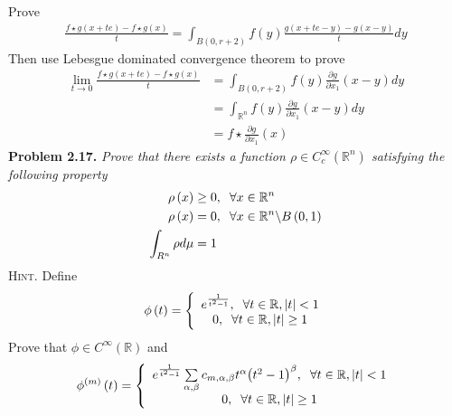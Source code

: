 \documentclass[a4paper]{article}
\numberwithin{equation}{section}
\begin{document}
Prove
\begin{align}
\frac{{f\star g\left( {x + te} \right) - f\star g\left( x \right)}}{t} = \int_{B\left( {0,r + 2} \right)} {f\left( y \right)\frac{{g\left( {x + te - y} \right) - g\left( {x - y} \right)}}{t}dy} 
\end{align}
Then use Lebesgue dominated convergence theorem to prove
\begin{align}
\mathop {\lim }\limits_{t \to 0} \frac{{f\star g\left( {x + te} \right) - f\star g\left( x \right)}}{t} &= \int_{B\left( {0,r + 2} \right)} {f\left( y \right)\frac{{\partial g}}{{\partial {x_1}}}\left( {x - y} \right)dy} \\
 &= \int_{{\mathbb{R}^n}} {f\left( y \right)\frac{{\partial g}}{{\partial {x_1}}}\left( {x - y} \right)dy} \\
 &= f\star \frac{{\partial g}}{{\partial {x_1}}}\left( x \right)
\end{align}
\textbf{Problem 2.17.} \textit{Prove that there exists a function $\rho \in C_c^\infty \left(\mathbb{R}^n\right)$ satisfying the following property}
\begin{align}
\rho \left( x \right) &\ge 0,\hspace{0.2cm}\forall x \in {\mathbb{R}^n}\\
\rho \left( x \right) &= 0,\hspace{0.2cm}\forall x \in {\mathbb{R}^n}\backslash B\left( {0,1} \right)\\
\int_{{R^n}} {\rho d\mu }  &= 1
\end{align}
\textsc{Hint.} Define
\begin{align}
\phi \left( t \right) = \left\{ {\begin{array}{*{20}{c}}
{{e^{\frac{1}{{{t^2} - 1}}}},\hspace{0.2cm}\forall t \in \mathbb{R},\left| t \right| < 1}\\
{0,\hspace{0.2cm}\forall t \in \mathbb{R},\left| t \right| \ge 1}
\end{array}} \right.
\end{align}
Prove that $\phi  \in {C^\infty }\left( \mathbb{R} \right)$ and
\begin{align}
{\phi ^{\left( m \right)}}\left( t \right) = \left\{ {\begin{array}{*{20}{c}}
{{e^{\frac{1}{{{t^2} - 1}}}}\sum\limits_{\alpha ,\beta } {{c_{m,\alpha ,\beta }}{t^\alpha }{{\left( {{t^2} - 1} \right)}^\beta }} ,\hspace{0.2cm}\forall t \in \mathbb{R},\left| t \right| < 1}\\
{0,\hspace{0.2cm}\forall t \in \mathbb{R},\left| t \right| \ge 1}
\end{array}} \right.
\end{align}
\end{document}
